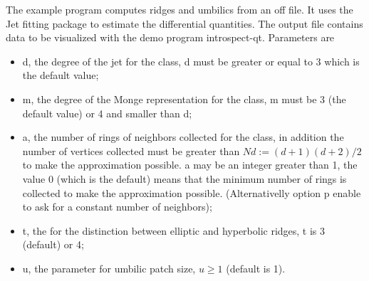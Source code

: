 The example program computes ridges and umbilics from an off file. It
uses the Jet fitting package to estimate the differential quantities.
The output file contains data to be visualized with the demo program introspect-qt.
Parameters are 
\begin{itemize}
\item
d, the degree of the jet for the  class, d
must be greater or equal to 3 which is the default value;
\item
m, the degree of the Monge representation for the
 class, m must be 3 (the default value) or
4 and smaller than d;
\item
a, the number of rings of neighbors collected for the
 class, in addition the number of vertices
collected must be greater than $Nd:=(d+1)(d+2)/2$ to make the
approximation possible. a may be an integer greater than 1, the value
0 (which is the default) means that the minimum number of rings is
collected to make the approximation possible. (Alternativelly option p
enable to ask for a constant number of neighbors);
\item
t, the  for the distinction between elliptic and
hyperbolic ridges, t is 3 (default) or 4;
\item
u, the parameter for umbilic patch size, $u \geq 1$ (default is 1).
\end{itemize}

